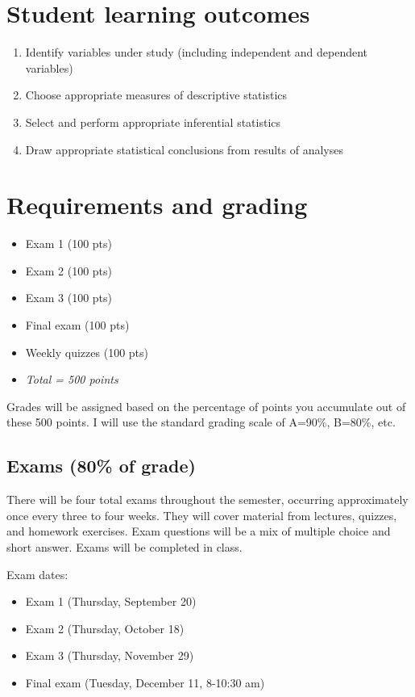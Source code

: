\documentclass[10pt]{article}
\begin{document}
\section*{Student learning outcomes}
\label{sec:org012d26e}
\begin{enumerate}
\item Identify variables under study (including independent and dependent variables)
\item Choose appropriate measures of descriptive statistics
\item Select and perform appropriate inferential statistics
\item Draw appropriate statistical conclusions from results of analyses
\end{enumerate}

\section*{Requirements and grading}
\label{sec:org9b808ba}
\begin{itemize}
\item Exam 1 (100 pts)
\item Exam 2 (100 pts)
\item Exam 3 (100 pts)
\item Final exam (100 pts)
\item Weekly quizzes (100 pts)
\item \emph{Total = 500 points}
\end{itemize}

Grades will be assigned based on the percentage of points you accumulate out of these 500 points.  I will use the standard grading scale of A=90\%, B=80\%, etc.

\subsection*{Exams (80\% of grade)}
\label{sec:orge70bdf2}
There will be four total exams throughout the semester, occurring approximately once every three to four weeks.  They will cover material from lectures, quizzes, and homework exercises.  Exam questions will be a mix of multiple choice and short answer.  Exams will be completed in class.

Exam dates:

\begin{itemize}
\item Exam 1 (Thursday, September 20)
\item Exam 2 (Thursday, October 18)
\item Exam 3 (Thursday, November 29)
\item Final exam (Tuesday, December 11, 8-10:30 am)
\end{itemize}
\end{document}
